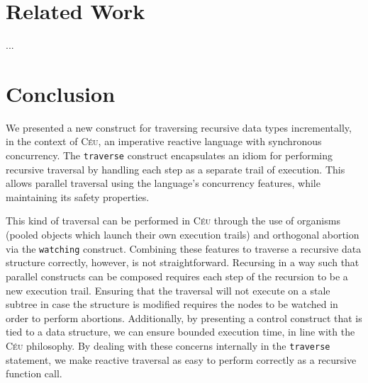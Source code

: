 \documentclass{acm_proc_article-sp}
\newcommand{\CEU}{\textsc{C\'{e}u}\xspace}
\newcommand{\code}[1] {{\small{\texttt{#1}}}}
\begin{document}
\section{Related Work}

...

\section{Conclusion}

We presented a new construct for traversing recursive data types
incrementally, in the context of \CEU, an imperative reactive language with
synchronous concurrency. The \code{traverse} construct encapsulates an idiom
for performing recursive traversal by handling each step as a separate trail
of execution. This allows parallel traversal using the language's concurrency
features, while maintaining its safety properties.

This kind of traversal can be performed in \CEU through the use of organisms
(pooled objects which launch their own execution trails) and orthogonal
abortion via the \code{watching} construct. Combining these features to
traverse a recursive data structure correctly, however, is not straightforward.
Recursing in a way such that parallel constructs can be composed requires each
step of the recursion to be a new execution trail. Ensuring that the traversal
will not execute on a stale subtree in case the structure is modified requires
the nodes to be watched in order to perform abortions. Additionally, by
presenting a control construct that is tied to a data structure, we can ensure
bounded execution time, in line with the \CEU philosophy. By dealing with these
concerns internally in the \code{traverse} statement, we make reactive
traversal as easy to perform correctly as a recursive function call.

\end{document}
